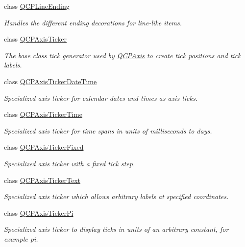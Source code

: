 \begin{DoxyCompactItemize}
class \hyperlink{class_q_c_p_line_ending}{Q\+C\+P\+Line\+Ending}
\begin{DoxyCompactList}\small\item\em Handles the different ending decorations for line-\/like items. \end{DoxyCompactList}\item 
class \hyperlink{class_q_c_p_axis_ticker}{Q\+C\+P\+Axis\+Ticker}
\begin{DoxyCompactList}\small\item\em The base class tick generator used by \hyperlink{class_q_c_p_axis}{Q\+C\+P\+Axis} to create tick positions and tick labels. \end{DoxyCompactList}\item 
class \hyperlink{class_q_c_p_axis_ticker_date_time}{Q\+C\+P\+Axis\+Ticker\+Date\+Time}
\begin{DoxyCompactList}\small\item\em Specialized axis ticker for calendar dates and times as axis ticks. \end{DoxyCompactList}\item 
class \hyperlink{class_q_c_p_axis_ticker_time}{Q\+C\+P\+Axis\+Ticker\+Time}
\begin{DoxyCompactList}\small\item\em Specialized axis ticker for time spans in units of milliseconds to days. \end{DoxyCompactList}\item 
class \hyperlink{class_q_c_p_axis_ticker_fixed}{Q\+C\+P\+Axis\+Ticker\+Fixed}
\begin{DoxyCompactList}\small\item\em Specialized axis ticker with a fixed tick step. \end{DoxyCompactList}\item 
class \hyperlink{class_q_c_p_axis_ticker_text}{Q\+C\+P\+Axis\+Ticker\+Text}
\begin{DoxyCompactList}\small\item\em Specialized axis ticker which allows arbitrary labels at specified coordinates. \end{DoxyCompactList}\item 
class \hyperlink{class_q_c_p_axis_ticker_pi}{Q\+C\+P\+Axis\+Ticker\+Pi}
\begin{DoxyCompactList}\small\item\em Specialized axis ticker to display ticks in units of an arbitrary constant, for example pi. \end{DoxyCompactList}\item 

\end{DoxyCompactItemize}
